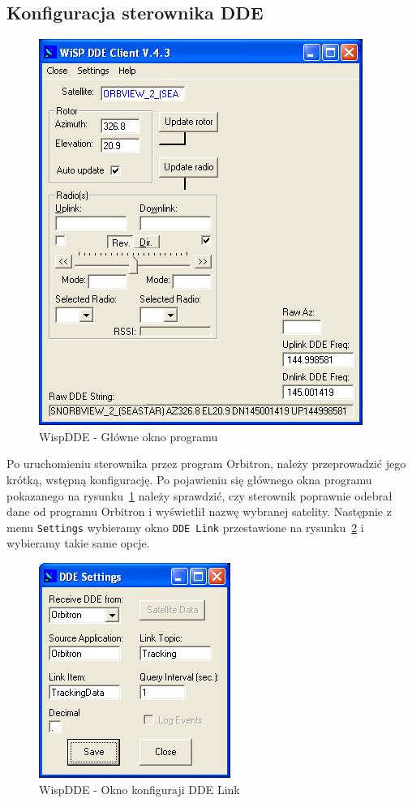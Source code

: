\documentclass[12pt,a4paper]{article}
\begin{document}
		\subsection{Konfiguracja sterownika DDE}
		\begin{figure}[!htb]
			\begin{center}
				\includegraphics[scale=0.7]{screen3}
			\end{center}
			\caption{WispDDE - Główne okno programu}
			\label{fig:WispDDE_main_window}
		\end{figure}
		Po uruchomieniu sterownika przez program Orbitron, należy przeprowadzić jego krótką, wstępną konfigurację. Po pojawieniu się głównego okna programu pokazanego na rysunku~\ref{fig:WispDDE_main_window} należy sprawdzić, czy sterownik poprawnie odebrał dane od programu Orbitron i wyświetlił nazwę wybranej satelity. Następnie z menu \texttt{Settings} wybieramy okno \texttt{DDE Link} przestawione na rysunku~\ref{fig:WispDDE_DDE_Link_settings} i wybieramy takie same opcje. 
		\begin{figure}[!htb]
			\begin{center}
				\includegraphics[scale=0.5]{screen4}
			\end{center}
			\caption{WispDDE - Okno konfiguraji DDE Link}
			\label{fig:WispDDE_DDE_Link_settings}
		\end{figure}
\end{document}

